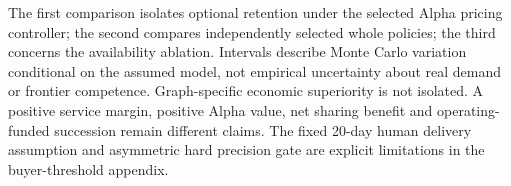 \par\smallskip The first comparison isolates optional retention under the selected Alpha pricing controller; the second compares independently selected whole policies; the third concerns the availability ablation. Intervals describe Monte Carlo variation conditional on the assumed model, not empirical uncertainty about real demand or frontier competence. Graph-specific economic superiority is not isolated. A positive service margin, positive Alpha value, net sharing benefit and operating-funded succession remain different claims. The fixed 20-day human delivery assumption and asymmetric hard precision gate are explicit limitations in the buyer-threshold appendix.
